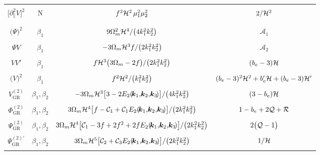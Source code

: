 \begin{longtable}{| c | c | c | c |}
&  &  & \\ 
$\big[\partial_{\parallel}^{2}V\big]^{2}$  & N &$f^{2}\mathcal{H}^2 \,\mu_{1}^{2}\mu_{2}^{2}$ & ${2}/{\mathcal{H}^{2}}$ \\ 
&  &  & \\
\hline 
&  &  & \\
$\big(\Psi\big)^{2}$ & $\beta_{1}$ & ${9}\Omega_{m}^{2}\mathcal{H}^{4}/{\big(4k_{1}^{2}k_{2}^{2}\big)}$ & $\mathcal{A}_{1}$ \\ 
&  &  & \\
${\Psi V}$ & $\beta_{1}$ & $-{3}\Omega_{m}\mathcal{H}^{3}f/{\big(2k_{1}^{2}k_{2}^{2}\big)}$  & $\mathcal{A}_{2}$ \\ 
&  &  & \\
$VV' $ & $\beta_{1}$  & ${ f\mathcal{H}^{3}\big(3\Omega_{m}-2f\big)/{\big(2k_{1}^{2}k_{2}^{2}\big)} }$ & $ (b_{e}-3)\mathcal{H}$ \\ 
&  &  & \\
$\big(V\big)^{2}$ & $\beta_{1}$ & $f^{2} \mathcal{H}^{2}/{\big(k_{1}^{2}k_{2}^{2}\big)}$ & $(b_{e}-3)^{2}\mathcal{H}^2+{b_{e}'\mathcal{H}} +(b_{e}-3){\mathcal{H}'} $ \\ 
&  &  & \\
${V^{(2)}_{\mathrm{GR}}}$ & $\beta_1,\beta_2$ & $-3\Omega_{m}\mathcal{H}^{3}\big[3 -2 E_{2}(\!\bm{k}_{1},\!\bm{k}_{2},\!\bm{k}_{3}\!)\big]/\big(4k_{1}^{2}k_{2}^{2}\big)$ & $(3-b_{e})\mathcal{H}$ \\
&  &  & \\
${\Phi^{(2)}_{\mathrm{GR}}}$ & $\beta_1,\beta_2$ & $3\Omega_{m}\mathcal{H}^{4}\big[{f-\mathcal{C}_1 + \mathcal{C}_1} E_{2}(\!\bm{k}_{1},\!\bm{k}_{2},\!\bm{k}_{3}\!)\big]/\big(2k_{1}^{2}k_{2}^{2}\big)$ & $1-b_e+2\mathcal{Q}+\mathcal{R}$ \\
&  &  & \\
${\Psi^{(2)}_{\mathrm{GR}}}$ & $\beta_1,\beta_2$ & $3\Omega_{m}\mathcal{H}^{4}\big[{\mathcal{C}_1-3f+2f^2 +2 f} E_{2}(\!\bm{k}_{1},\!\bm{k}_{2},\!\bm{k}_{3}\!)\big]/\big(2k_{1}^{2}k_{2}^{2}\big)$ & $2\big(\mathcal{Q} - 1\big)$ \\
&  &  & \\
${\Psi^{(2)\prime}_{\mathrm{GR}}}$ & $\beta_1,\beta_2$ & $3\Omega_{m}\mathcal{H}^{5}\big[{\mathcal{C}_2 +  \mathcal{C}_{3}} E_{2}(\!\bm{k}_{1},\!\bm{k}_{2},\!\bm{k}_{3}\!)\big]/\big(2k_{1}^{2}k_{2}^{2}\big)$ & ${1}/{\mathcal{H}}$ \\
&  &  & \\

\end{longtable}
